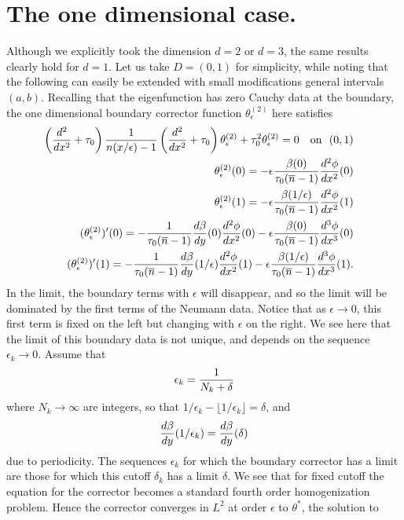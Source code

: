 \documentclass[12pt]{article}
\begin{document}
\section{The one dimensional case.}
Although we explicitly took the dimension $d=2$ or $d=3$, the same results clearly hold for $d=1$. Let us take $D=(0,1)$ for simplicity, while noting that the following can easily be extended with small modifications general intervals $(a,b)$. 
Recalling that the eigenfunction has zero Cauchy data at the boundary, the one dimensional boundary corrector function $\theta_\epsilon^{(2)}$ here satisfies 
\begin{eqnarray}   \left({d^2\over{dx^2}}+\tau_0\right) \frac{1}{n(x/\epsilon)-1} \left( {d^2\over{dx^2}}+\tau_0\right) \theta_\epsilon^{(2)} +\tau_0^2\theta_\epsilon^{(2)} =  0 \ \ \ \mbox{on}\ \ (0,1) & &\label{theta1d} \\ 
\theta_\epsilon^{(2)}(0) = -\epsilon \frac{\beta(0)}{\tau_0(\overline{n}-1)} {d^2\phi\over{dx^2}}(0)  & & \nonumber \\ \theta_\epsilon^{(2)}(1) = -\epsilon \frac{\beta(1/\epsilon) }{\tau_0(\overline{n}-1)}{d^2\phi\over{dx^2}}(1)& & \nonumber \\ (\theta_\epsilon^{(2)})'(0) = -  \frac{1}{\tau_0(\overline{n}-1)}{d\beta\over{d y}}(0) {d^2\phi\over{dx^2}}(0)  -\epsilon   \frac{\beta(0)}{\tau_0(\overline{n}-1)} {d^3\phi\over{dx^3}} (0)  && \nonumber\\  (\theta_\epsilon^{(2)})'(1) = -  \frac{1}{\tau_0(\overline{n}-1)}{d\beta\over{d y}}(1/\epsilon) {d^2\phi\over{dx^2}}(1)  -\epsilon  \frac{\beta(1/\epsilon)}{\tau_0(\overline{n}-1)}  {d^3\phi\over{dx^3}}(1).\nonumber\end{eqnarray}
In the limit, the boundary terms with $\epsilon$ will disappear, and so the limit will be dominated by the first terms of the Neumann data. Notice that as $\epsilon\rightarrow 0$, this first term is fixed on the left but changing with $\epsilon$ on the right. We see here that the limit of this boundary data is not unique, and depends on the sequence $\epsilon_k \rightarrow 0$. Assume that $$\epsilon_k = {1\over{N_k+\delta}}$$
where $N_k\rightarrow\infty$ are integers, so that $1/\epsilon_k -\lfloor{1/\epsilon_k}\rfloor = \delta$, and 
$$ {d\beta\over{d y}}(1/\epsilon_k) = {d\beta\over{d y}}(\delta) $$
due to periodicity. The sequences $\epsilon_k$ for which the boundary corrector has a limit are those for which this cutoff $\delta_k$ has a limit $\delta$. We see that for fixed cutoff  the equation for the corrector becomes a standard fourth order homogenization problem. Hence the corrector converges in $L^2$ at order $\epsilon$ to $\theta^*$, the solution to 
\end{document}

